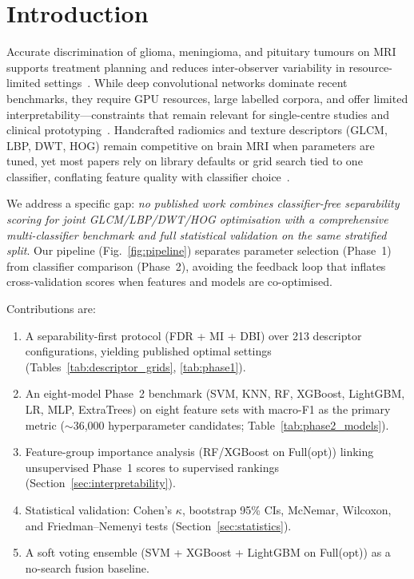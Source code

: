 \section{Introduction}
\label{sec:introduction}

Accurate discrimination of glioma, meningioma, and pituitary tumours on MRI supports treatment planning and reduces inter-observer variability in resource-limited settings~\cite{ref_bioengineering11030266,ref_diagnostics15212692}.
While deep convolutional networks dominate recent benchmarks, they require GPU resources, large labelled corpora, and offer limited interpretability---constraints that remain relevant for single-centre studies and clinical prototyping~\cite{ref_access20253579727,ref_011573405636519125060212}.
Handcrafted radiomics and texture descriptors (GLCM, LBP, DWT, HOG) remain competitive on brain MRI when parameters are tuned, yet most papers rely on library defaults or grid search tied to one classifier, conflating feature quality with classifier choice~\cite{ref_ijigsp20150303,ref_fonc20231248452}.

We address a specific gap: \emph{no published work combines classifier-free separability scoring for joint GLCM/LBP/DWT/HOG optimisation with a comprehensive multi-classifier benchmark and full statistical validation on the same stratified split}.
Our pipeline (Fig.~\ref{fig:pipeline}) separates parameter selection (Phase~1) from classifier comparison (Phase~2), avoiding the feedback loop that inflates cross-validation scores when features and models are co-optimised.

Contributions are:
\begin{enumerate}
    \item A separability-first protocol (FDR + MI + DBI) over 213 descriptor configurations, yielding published optimal settings (Tables~\ref{tab:descriptor_grids}, \ref{tab:phase1}).
    \item An eight-model Phase~2 benchmark (SVM, KNN, RF, XGBoost, LightGBM, LR, MLP, ExtraTrees) on eight feature sets with macro-F1 as the primary metric ($\sim$36{,}000 hyperparameter candidates; Table~\ref{tab:phase2_models}).
    \item Feature-group importance analysis (RF/XGBoost on Full(opt)) linking unsupervised Phase~1 scores to supervised rankings (Section~\ref{sec:interpretability}).
    \item Statistical validation: Cohen's $\kappa$, bootstrap 95\% CIs, McNemar, Wilcoxon, and Friedman--Nemenyi tests (Section~\ref{sec:statistics}).
    \item A soft voting ensemble (SVM + XGBoost + LightGBM on Full(opt)) as a no-search fusion baseline.
\end{enumerate}

